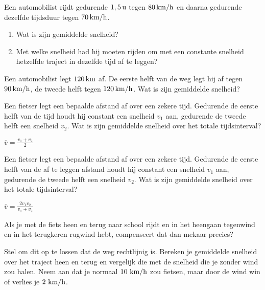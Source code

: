 \documentclass{ximera}
\begin{document}
	\author{Bart Lambregs}
    \xmsource\xmuitleg

\begin{exercise}
    Een automobilist rijdt gedurende $1,5\rm\,u$ tegen $80\rm\,km/h$ en daarna gedurende dezelfde tijdsduur tegen
    $70\rm\,km/h$.
    \begin{enumerate}
        \item Wat is zijn gemiddelde snelheid?
        \item Met welke snelheid had hij moeten rijden om met een constante snelheid hetzelfde traject in dezelfde tijd af te leggen?
\end{enumerate}
\end{exercise}

\begin{exercise}
    Een automobilist legt $120\rm\,km$ af. De eerste helft van de weg legt hij af tegen $90\rm\,km/h$, de tweede helft tegen $120\rm\,km/h$. Wat is zijn gemiddelde snelheid?
\end{exercise}

\begin{exercise}
    Een fietser legt een bepaalde afstand af over een zekere tijd. Gedurende de eerste helft van de tijd houdt hij constant een snelheid $v_1$ aan, gedurende de tweede helft een snelheid $v_2$. Wat is zijn gemiddelde snelheid over het totale tijdsinterval?
    \begin{oplossing}
        $\overline{v}=\frac{v_1+v_2}{2}$
    \end{oplossing}
\end{exercise}

\begin{exercise}
    Een fietser legt een bepaalde afstand af over een zekere tijd. Gedurende de eerste helft van de af te leggen afstand houdt hij constant een snelheid $v_1$ aan, gedurende de tweede helft een snelheid $v_2$. Wat is zijn gemiddelde snelheid over het totale tijdsinterval? 
    \begin{oplossing}
        $\overline{v}=\frac{2v_1v_2}{v_1+v_2}$
    \end{oplossing}
\end{exercise}

\begin{exercise}
    Als je met de fiets heen en terug naar school rijdt en in het heengaan tegenwind en in het terugkeren rugwind hebt, compenseert dat dan mekaar precies?

    Stel om dit op te lossen dat de weg rechtlijnig is. Bereken je gemiddelde snelheid over het traject heen en terug en vergelijk die met de snelheid die je zonder wind zou halen. Neem aan dat je normaal $10~\rm km/h$ zou fietsen, maar door de wind win of verlies je $2~\rm km/h$.
    \begin{multipleChoice}
    \end{multipleChoice}
\end{exercise}
\end{document}
